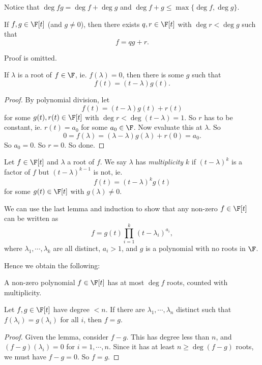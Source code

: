 \documentclass[a4paper]{article}
\begin{document}
Notice that $\deg fg = \deg f + \deg g$ and $\deg f + g \leq \max\{\deg f, \deg g\}$.

\begin{lemma}
  If $f, g \in \F[t]$ (and $g \not= 0$), then there exists $q, r \in \F[t]$ with $\deg r < \deg g$ such that
  \[
    f = qg + r.
  \]
\end{lemma}
Proof is omitted.

\begin{lemma}
  If $\lambda$ is a root of $f \in \F$, ie. $f(\lambda) = 0$, then there is some $g$ such that
  \[
    f(t) = (t - \lambda) g(t).
  \]
\end{lemma}

\begin{proof}
  By polynomial division, let
  \[
    f(t) = (t - \lambda)g(t) + r(t)
  \]
  for some $g(t), r(t) \in \F[t]$ with $\deg r < \deg (t - \lambda) = 1$. So $r$ has to be constant, ie. $r(t) = a_0$ for some $a_0 \in \F$. Now evaluate this at $\lambda$. So
  \[
    0 = f(\lambda) = (\lambda - \lambda)g(\lambda) + r(0) = a_0.
  \]
  So $a_0 = 0$. So $r = 0$. So done.
\end{proof}

\begin{defi}
  Let $f \in \F[t]$ and $\lambda$ a root of $f$. We say $\lambda$ has \emph{multiplicity} $k$ if $(t - \lambda)^k$ is a factor of $f$ but $(t - \lambda)^{k - 1}$ is not, ie.
  \[
    f(t) = (t - \lambda)^k g(t)
  \]
  for some $g(t) \in \F[t]$ with $g(\lambda) \not= 0$.
\end{defi}

We can use the last lemma and induction to show that any non-zero $f \in \F[t]$ can be written as
\[
  f = g(t) \prod_{i = 1}^k (t - \lambda_i)^{a_i},
\]
where $\lambda_1, \cdots, \lambda_k$ are all distinct, $a_i > 1$, and $g$ is a polynomial with no roots in $\F$.

Hence we obtain the following:
\begin{lemma}
  A non-zero polynomial $f \in \F[t]$ has at most $\deg f$ roots, counted with multiplicity.
\end{lemma}

\begin{cor}
  Let $f, g \in \F[t]$ have degree $<n$. If there are $\lambda_1, \cdots, \lambda_n$ distinct such that $f(\lambda_i) = g(\lambda_i)$ for all $i$, then $f = g$.
\end{cor}

\begin{proof}
  Given the lemma, consider $f - g$. This has degree less than $n$, and $(f - g)(\lambda_i) = 0$ for $i = 1, \cdots, n$. Since it has at least $n \geq \deg(f - g)$ roots, we must have $f - g = 0$. So $f = g$.
\end{proof}
\end{document}
